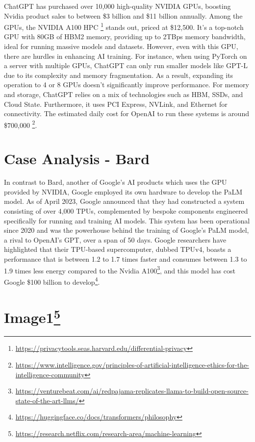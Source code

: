 \documentclass[
]{book}
\begin{document}
ChatGPT has purchased over 10,000 high-quality NVIDIA GPUs, boosting Nvidia product sales to between \$3 billion and \$11 billion annually. Among the GPUs, the NVIDIA A100 HPC \footnote{\url{https://privacytools.seas.harvard.edu/differential-privacy}} stands out, priced at \$12,500. It's a top-notch GPU with 80GB of HBM2 memory, providing up to 2TBps memory bandwidth, ideal for running massive models and datasets. However, even with this GPU, there are hurdles in enhancing AI training. For instance, when using PyTorch on a server with multiple GPUs, ChatGPT can only run smaller models like GPT-L due to its complexity and memory fragmentation. As a result, expanding its operation to 4 or 8 GPUs doesn't significantly improve performance. For memory and storage, ChatGPT relies on a mix of technologies such as HBM, SSDs, and Cloud State. Furthermore, it uses PCI Express, NVLink, and Ethernet for connectivity. The estimated daily cost for OpenAI to run these systems is around \$700,000 \footnote{\url{https://www.intelligence.gov/principles-of-artificial-intelligence-ethics-for-the-intelligence-community}}.

\hypertarget{case-analysis---bard}{%
\section{Case Analysis - Bard}\label{case-analysis---bard}}

In contrast to Bard, another of Google's AI products which uses the GPU provided by NVIDIA, Google employed its own hardware to develop the PaLM model. As of April 2023, Google announced that they had constructed a system consisting of over 4,000 TPUs, complemented by bespoke components engineered specifically for running and training AI models. This system has been operational since 2020 and was the powerhouse behind the training of Google's PaLM model, a rival to OpenAI's GPT, over a span of 50 days. Google researchers have highlighted that their TPU-based supercomputer, dubbed TPUv4, boasts a performance that is between 1.2 to 1.7 times faster and consumes between 1.3 to 1.9 times less energy compared to the Nvidia A100\footnote{\url{https://venturebeat.com/ai/redpajama-replicates-llama-to-build-open-source-state-of-the-art-llms/}}, and this model has cost Google \$100 billion to develop\footnote{\url{https://huggingface.co/docs/transformers/philosophy}}.

\hypertarget{image15}{%
\section[Image1]{\texorpdfstring{Image1\footnote{\url{https://research.netflix.com/research-area/machine-learning}}}{Image1}}\label{image15}}
\end{document}
